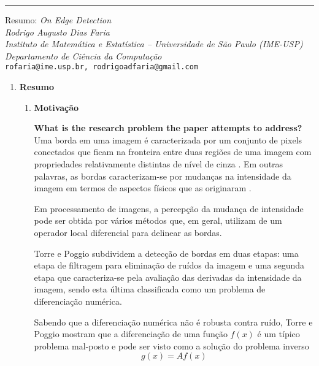 \noindent\rule{14.5cm}{0.4pt}

\begin{center}
    {\Large Resumo: \textit{On Edge Detection}}
    \\[8pt]
    
    \textit{Rodrigo Augusto Dias Faria}
    \\[8pt]
    
    \textit{Instituto de Matemática e Estatística -- Universidade de São Paulo (IME-USP)\\
    Departamento de Ciência da Computação
    }\\[8pt]
    
    \texttt{rofaria@ime.usp.br, rodrigoadfaria@gmail.com}
\end{center}

\begin{enumerate}
\item \textbf{Resumo}
\begin{enumerate}[label*=\arabic*.]
    \item \textbf{Motivação}
    
    \textbf{What is the research problem the paper attempts to address?}\\
    Uma borda em uma imagem é caracterizada por um conjunto de pixels conectados que ficam na fronteira entre duas regiões de uma imagem com propriedades relativamente distintas de nível de cinza \cite{gonzalez2002digital}. Em outras palavras, as bordas caracterizam-se por mudanças na intensidade da imagem em termos de aspectos físicos que as originaram \cite{Torre-1986}.
    
    Em processamento de imagens, a percepção da mudança de intensidade pode ser obtida por vários métodos que, em geral, utilizam de um operador local diferencial para delinear as bordas.
    
    Torre e Poggio subdividem a detecção de bordas em duas etapas: uma etapa de filtragem para eliminação de ruídos da imagem  e uma segunda etapa que caracteriza-se pela avaliação das derivadas da intensidade da imagem, sendo esta última classificada como um problema de diferenciação numérica.
    
    Sabendo que a diferenciação numérica não é robusta contra ruído, Torre e Poggio mostram que a diferenciação de uma função $f(x)$ é um típico problema mal-posto e pode ser visto como a solução do problema inverso
\begin{equation} \label{eq:inverse_problem}
   g(x) = A f(x)
\end{equation}


\end{enumerate}
\end{enumerate}
